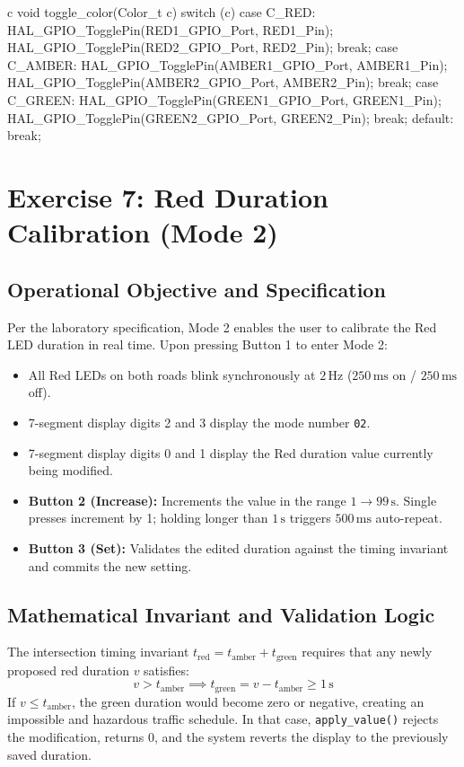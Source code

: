 \documentclass{hcmut-report}
\begin{document}
\begin{code}{c}
void toggle_color(Color_t c)
{
  switch (c) {
    case C_RED:
      HAL_GPIO_TogglePin(RED1_GPIO_Port, RED1_Pin);
      HAL_GPIO_TogglePin(RED2_GPIO_Port, RED2_Pin);
      break;
    case C_AMBER:
      HAL_GPIO_TogglePin(AMBER1_GPIO_Port, AMBER1_Pin);
      HAL_GPIO_TogglePin(AMBER2_GPIO_Port, AMBER2_Pin);
      break;
    case C_GREEN:
      HAL_GPIO_TogglePin(GREEN1_GPIO_Port, GREEN1_Pin);
      HAL_GPIO_TogglePin(GREEN2_GPIO_Port, GREEN2_Pin);
      break;
    default:
      break;
  }
}
\end{code}


\newpage
\section{Exercise 7: Red Duration Calibration (Mode 2)}

\subsection{Operational Objective and Specification}
Per the laboratory specification, Mode 2 enables the user to calibrate the Red LED duration in real time. Upon pressing Button 1 to enter Mode 2:
\begin{itemize}
    \item All Red LEDs on both roads blink synchronously at $2\,\text{Hz}$ ($250\,\text{ms}$ on / $250\,\text{ms}$ off).
    \item 7-segment display digits 2 and 3 display the mode number \texttt{02}.
    \item 7-segment display digits 0 and 1 display the Red duration value currently being modified.
    \item \textbf{Button 2 (Increase):} Increments the value in the range $1 \to 99\,\text{s}$. Single presses increment by 1; holding longer than $1\,\text{s}$ triggers $500\,\text{ms}$ auto-repeat.
    \item \textbf{Button 3 (Set):} Validates the edited duration against the timing invariant and commits the new setting.
\end{itemize}

\subsection{Mathematical Invariant and Validation Logic}
The intersection timing invariant $t_{\text{red}} = t_{\text{amber}} + t_{\text{green}}$ requires that any newly proposed red duration $v$ satisfies:
\begin{equation}
    v > t_{\text{amber}} \implies t_{\text{green}} = v - t_{\text{amber}} \ge 1\,\text{s}
\end{equation}
If $v \le t_{\text{amber}}$, the green duration would become zero or negative, creating an impossible and hazardous traffic schedule. In that case, \texttt{apply\_value()} rejects the modification, returns $0$, and the system reverts the display to the previously saved duration.
\end{document}
